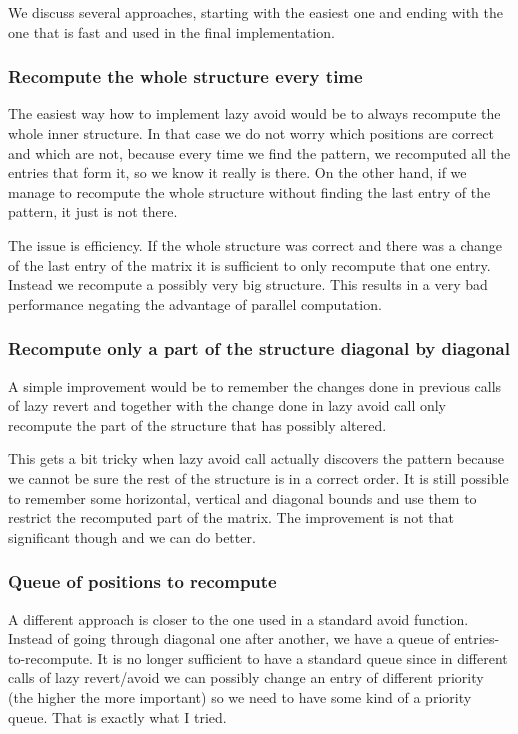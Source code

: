 We discuss several approaches, starting with the easiest one and ending with the one that is fast and used in the final implementation.

\subsubsection{Recompute the whole structure every time}
The easiest way how to implement lazy avoid would be to always recompute the whole inner structure. In that case we do not worry which positions are correct and which are not, because every time we find the pattern, we recomputed all the entries that form it, so we know it really is there. On the other hand, if we manage to recompute the whole structure without finding the last entry of the pattern, it just is not there.

The issue is efficiency. If the whole structure was correct and there was a change of the last entry of the matrix it is sufficient to only recompute that one entry. Instead we recompute a possibly very big structure. This results in a very bad performance negating the advantage of parallel computation.
\subsubsection{Recompute only a part of the structure diagonal by diagonal}
A simple improvement would be to remember the changes done in previous calls of lazy revert and together with the change done in lazy avoid call only recompute the part of the structure that has possibly altered.

This gets a bit tricky when lazy avoid call actually discovers the pattern because we cannot be sure the rest of the structure is in a correct order. It is still possible to remember some horizontal, vertical and diagonal bounds and use them to restrict the recomputed part of the matrix. The improvement is not that significant though and we can do better.
\subsubsection{Queue of positions to recompute}
A different approach is closer to the one used in a standard avoid function. Instead of going through diagonal one after another, we have a queue of entries-to-recompute. It is no longer sufficient to have a standard queue since in different calls of lazy revert/avoid we can possibly change an entry of different priority (the higher the more important) so we need to have some kind of a priority queue. That is exactly what I tried.

